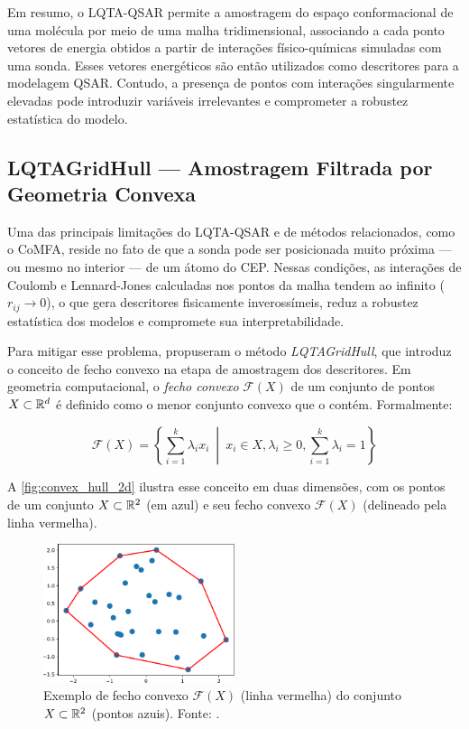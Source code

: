 Em resumo, o LQTA-QSAR permite a amostragem do espaço conformacional de uma molécula por meio de uma malha tridimensional, associando a cada ponto vetores de energia obtidos a partir de interações físico-químicas simuladas com uma sonda. Esses vetores energéticos são então utilizados como descritores para a modelagem QSAR. Contudo, a presença de pontos com interações singularmente elevadas pode introduzir variáveis irrelevantes e comprometer a robustez estatística do modelo.

\subsection{LQTAGridHull — Amostragem Filtrada por Geometria Convexa}

Uma das principais limitações do LQTA-QSAR e de métodos relacionados, como o CoMFA, reside no fato de que a sonda pode ser posicionada muito próxima --- ou mesmo no interior --- de um átomo do CEP. Nessas condições, as interações de Coulomb e Lennard-Jones calculadas nos pontos da malha tendem ao infinito ($r_{ij} \to 0$), o que gera descritores fisicamente inverossímeis, reduz a robustez estatística dos modelos e compromete sua interpretabilidade.

Para mitigar esse problema, \textcite{Tenorio2018} propuseram o método \textit{LQTAGridHull}, que introduz o conceito de fecho convexo na etapa de amostragem dos descritores. Em geometria computacional, o \emph{fecho convexo} $\mathcal{F}(X)$ de um conjunto de pontos $X \subset \mathbb{R}^d$ é definido como o menor conjunto convexo que o contém. Formalmente:

\begin{equation} \label{eq:def-convex-hull}
\mathcal{F}(X) = \left\{ \sum_{i=1}^{k} \lambda_i x_i \ \middle| \ x_i \in X, \lambda_i \ge 0, \sum_{i=1}^{k} \lambda_i = 1 \right\}
\end{equation}

A \autoref{fig:convex_hull_2d} ilustra esse conceito em duas dimensões, com os pontos de um conjunto $X \subset \mathbb{R}^2$ (em azul) e seu fecho convexo $\mathcal{F}(X)$ (delineado pela linha vermelha).

\begin{figure}
  \centering
  \includegraphics[width=0.5\textwidth]{img/convex_hull_2d.pdf}
  \caption{Exemplo de fecho convexo $\mathcal{F}(X)$ (linha vermelha) do conjunto $X \subset \mathbb{R}^2$ (pontos azuis). Fonte: \textcite{Tenorio2018}.}
  \label{fig:convex_hull_2d}
\end{figure}

